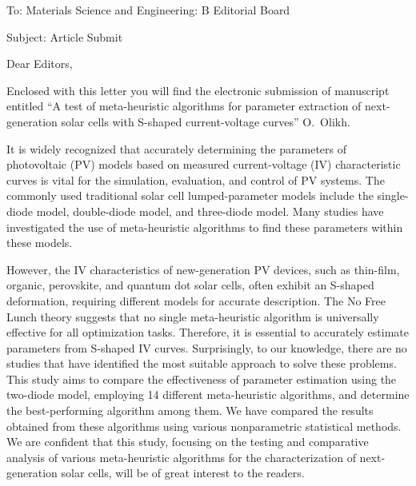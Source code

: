 \documentclass[preprint]{elsarticle}
\begin{document}
To:
Materials Science and Engineering: B Editorial Board


Subject:
Article Submit

\vspace{5mm}
Dear Editors,

\vspace{3mm}
Enclosed with this letter you will find the electronic submission of manuscript entitled
``A test of meta-heuristic algorithms for parameter extraction of next-generation solar cells with S-shaped current-voltage curves'' O.~Olikh.



It is widely recognized that accurately determining the parameters of photovoltaic (PV) models
based on measured current-voltage (IV) characteristic curves is vital for the simulation, evaluation, and control of PV systems.
The commonly used traditional solar cell lumped-parameter models include the single-diode model, double-diode model, and three-diode model.
Many studies have investigated the use of meta-heuristic algorithms to find these parameters within these models.

However, the IV characteristics of new-generation PV devices, such as thin-film, organic, perovskite, and quantum dot solar cells, often exhibit an S-shaped deformation, requiring different models for accurate description.
The No Free Lunch theory suggests that no single meta-heuristic algorithm is universally effective for all optimization tasks.
Therefore, it is essential to accurately estimate parameters from S-shaped IV curves.
Surprisingly, to our knowledge, there are no studies that have identified the most suitable approach to solve these problems.
This study aims to compare the effectiveness of parameter estimation using the two-diode model, employing 14 different meta-heuristic algorithms, and determine the best-performing algorithm among them.
We have compared the results obtained from these algorithms using various nonparametric statistical methods.
We are confident that this study, focusing on the testing and comparative analysis of various meta-heuristic algorithms for the characterization of next-generation solar cells, will be of great interest to the readers.
\end{document}
